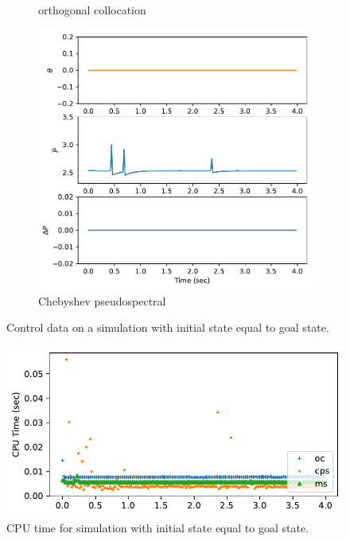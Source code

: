 \documentclass[]{article}
\begin{document}
\begin{figure}[H]
\begin{subfigure}[b]{0.3\textwidth}
 		\caption{orthogonal collocation}
 	\end{subfigure}%
 	\begin{subfigure}[b]{0.3\textwidth}
 		\centering
 		\includegraphics[width=\textwidth]{figures/controlhover5.pdf}
 		\caption{Chebyshev pseudospectral}
 	\end{subfigure}
 	\caption{Control data on a simulation with initial state equal to goal state.}
 	\label{fig:controlhover}
 \end{figure}
 
 
 \begin{figure}[H]
 	\centering
 	\includegraphics[width=\textwidth]{figures/timehover.pdf}
 	\caption{CPU time for simulation with initial state equal to goal state.}
 	\label{fig:timehover}
 \end{figure}
 
\end{document}
